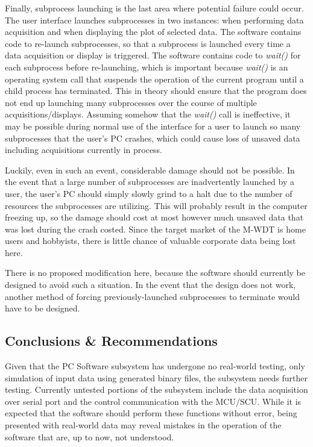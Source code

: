 Finally, subprocess launching is the last area where potential failure could occur. The user interface
launches subprocesses in two instances: when performing data acquisition and when displaying the plot
of selected data. The software contains code to re-launch subprocesses, so that a subprocess is launched
every time a data acquisition or display is triggered. The software contains code to \textit{wait()} 
for each subprocess before re-launching, which is important because \textit{wait()} is an operating system
call that suspends the operation of the current program until a child process has terminated. This in theory
should ensure that the program does not end up launching many subprocesses over the course of multiple 
acquisitions/displays. Assuming somehow that the \textit{wait()} call is ineffective, it may
be possible during normal use of the interface for a user to launch so many subprocesses that the user's
PC crashes, which could cause loss of unsaved data including acquisitions currently in process.

Luckily, even in such an event, considerable damage should not be possible. In the event that a large
number of subprocesses are inadvertently launched by a user, the user's PC should simply slowly grind
to a halt due to the number of resources the subprocesses are utilizing. This will probably result in
the computer freezing up, so the damage should cost at most however much unsaved data that was lost
during the crash costed. Since the target market of the M-WDT is home users and hobbyists,
there is little chance of valuable corporate data being lost here.

There is no proposed modification here, because the software should currently be designed to avoid
such a situation. In the event that the design does not work, another method of forcing previously-launched
subprocesses to terminate would have to be designed. 


\subsection[Conclusions \& Recommendations]{Conclusions \& Recommendations}
Given that the PC Software subsystem has undergone no real-world testing, only 
simulation of input data using generated binary files, the subsystem needs further
testing. Currently untested portions of the subsystem include the data acquisition
over serial port and the control communication with the MCU/SCU. While it 
is expected that the software should perform these functions without error, being
presented with real-world data may reveal mistakes in the operation of the software 
that are, up to now, not understood.

